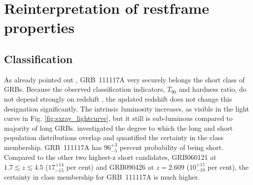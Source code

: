 \documentclass{aa}    %
\begin{document}
\section{Reinterpretation of restframe properties}


\subsection{Classification}

As already pointed out \citep{Margutti2012, Sakamoto2013}, GRB~111117A very
securely belongs the short class of GRBs. Because the observed classification
indicators, $T_{90}$ and hardness ratio, do not depend strongly on redshift
\citep{Littlejohns2013a}, the updated redshift does not change this designation
significantly. The intrinsic luminosity increases, as visible in the light curve
in Fig. \ref{fig:sxray_lightcurve}, but it still is sub-luminous compared to
majority of long GRBs. \citet{Bromberg2013} investigated the degree to which the
long and short population distributions overlap and quantified the certainty in
the class membership. GRB~111117A has $96_{-5}^{+3}$ percent probability of
being short. Compared to the other two highest-z short candidates, GRB060121
\citep{DeUgartePostigo2006, Levan2006} at $1.7 \lesssim z \lesssim 4.5$
($17_{-15}^{+14}$ per cent) and GRB090426 \citep{Antonelli2009, Levesque2010,
	Thone2011} at $z = 2.609$ ($10_{-10}^{+15}$ per cent), the certainty in class
membership for GRB~111117A is much higher.
\end{document}
